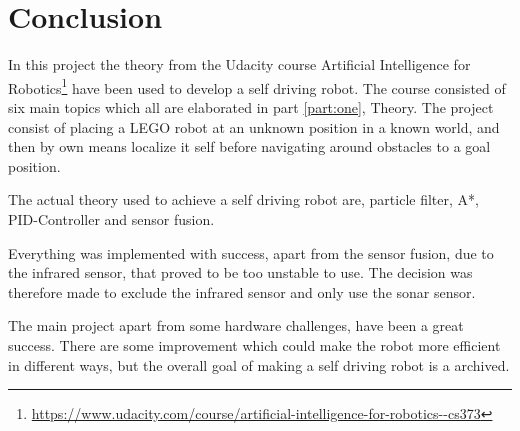 \chapter{Conclusion}
\label{chp:conc}

In this project the theory from the Udacity course Artificial Intelligence for Robotics\footnote{\url{https://www.udacity.com/course/artificial-intelligence-for-robotics--cs373}} have been used to develop a self driving robot.
The course consisted of six main topics which all are elaborated in part \ref{part:one}, Theory.
The project consist of placing a LEGO robot at an unknown position in a known world, and then by own means localize it self before navigating around obstacles to a goal position.

The actual theory used to achieve a self driving robot are, particle filter, A*, PID-Controller and sensor fusion.

Everything was implemented with success, apart from the sensor fusion, due to the infrared sensor, that proved to be too unstable to use.
The decision was therefore made to exclude the infrared sensor and only use the sonar sensor.

The main project apart from some hardware challenges, have been a great success.
There are some improvement which could make the robot more efficient in different ways, but the overall goal of making a self driving robot is a archived.